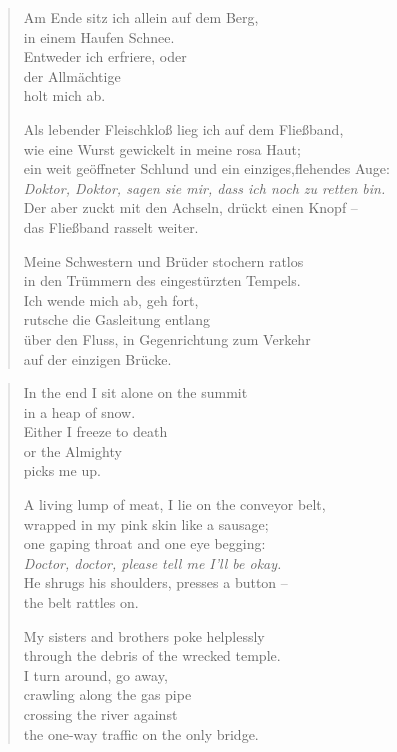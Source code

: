 
\cleartoverso


\begin{verse}
Am Ende sitz ich allein auf dem Berg,\\
in einem Haufen Schnee.\\
Entweder ich erfriere, oder\\
der Allmächtige\\
holt mich ab.

\rhytmbreak

Als lebender Fleischkloß lieg ich auf dem Fließband,\\
wie eine Wurst gewickelt in meine rosa Haut;\\
ein weit geöffneter Schlund und ein einziges,\verselinebreak flehendes Auge:\\
\emph{Doktor, Doktor, sagen sie mir, dass ich noch zu retten bin.}\\
Der aber zuckt mit den Achseln, drückt einen Knopf --\\
das Fließband rasselt weiter.

\rhytmbreak

Meine Schwestern und Brüder stochern ratlos\\
in den Trümmern des eingestürzten Tempels.\\
Ich wende mich ab, geh fort,\\
rutsche die Gasleitung entlang\\
über den Fluss, in Gegenrichtung zum Verkehr\\
auf der einzigen Brücke.

\end{verse}

\clearpage


\begin{verse}
In the end I sit alone on the summit\\
in a heap of snow.\\
Either I freeze to death\\
or the Almighty\\
picks me up.

\rhytmbreak

A living lump of meat, I lie on the conveyor belt,\\
wrapped in my pink skin like a sausage;\\
one gaping throat and one eye begging:\\
\emph{Doctor, doctor, please tell me I'll be okay.}\\
He shrugs his shoulders, presses a button --\\
the belt rattles on.

\rhytmbreak

My sisters and brothers poke helplessly\\
through the debris of the wrecked temple.\\
I turn around, go away,\\
crawling along the gas pipe\\
crossing the river against\\
the one-way traffic on the only bridge.

\end{verse}

